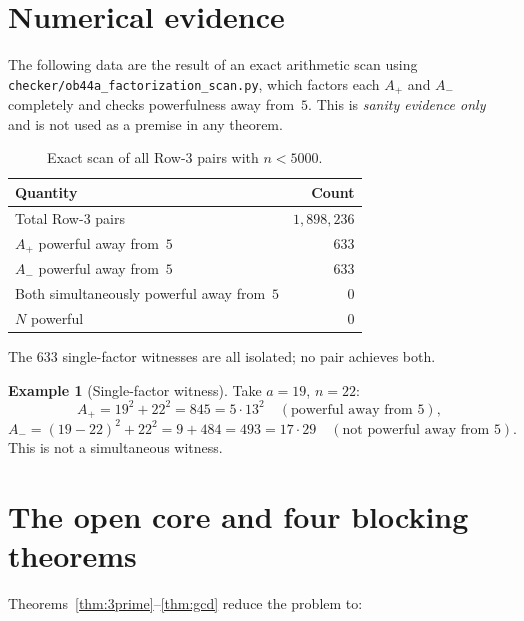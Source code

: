 \documentclass[12pt]{amsart}
\theoremstyle{plain}
\theoremstyle{definition}
\newtheorem{example}[theorem]{Example}
\theoremstyle{remark}
\newcommand{\Aplus}{A_{+}}
\newcommand{\Aminus}{A_{-}}
\begin{document}
\section{Numerical evidence}
\label{sec:numerical}

The following data are the result of an exact arithmetic scan using
\texttt{checker/ob44a\_factorization\_scan.py}, which factors each $\Aplus$
and $\Aminus$ completely and checks powerfulness away from~$5$.
This is \emph{sanity evidence only} and is not used as a premise in
any theorem.

\begin{table}[h]
\centering
\caption{Exact scan of all Row-3 pairs with $n < 5000$.}
\label{tab:scan}%
\begin{tabular}{lr}
\toprule
Quantity & Count \\
\midrule
Total Row-3 pairs & $1{,}898{,}236$ \\
$\Aplus$ powerful away from~$5$ & $633$ \\
$\Aminus$ powerful away from~$5$ & $633$ \\
Both simultaneously powerful away from~$5$ & $0$ \\
$N$ powerful & $0$ \\
\bottomrule
\end{tabular}
\end{table}

\noindent
The $633$ single-factor witnesses are all isolated; no pair achieves both.

\begin{example}[Single-factor witness]
\label{ex:witness}%
Take $a=19$, $n=22$:
\[
  \Aplus = 19^2+22^2 = 845 = 5\cdot 13^2
  \quad(\text{powerful away from }5),
\]
\[
  \Aminus = (19-22)^2+22^2 = 9+484 = 493 = 17\cdot 29
  \quad(\text{not powerful away from }5).
\]
This is not a simultaneous witness.
\end{example}

\section{The open core and four blocking theorems}
\label{sec:open}

Theorems~\ref{thm:3prime}--\ref{thm:gcd} reduce the problem to:
\end{document}
